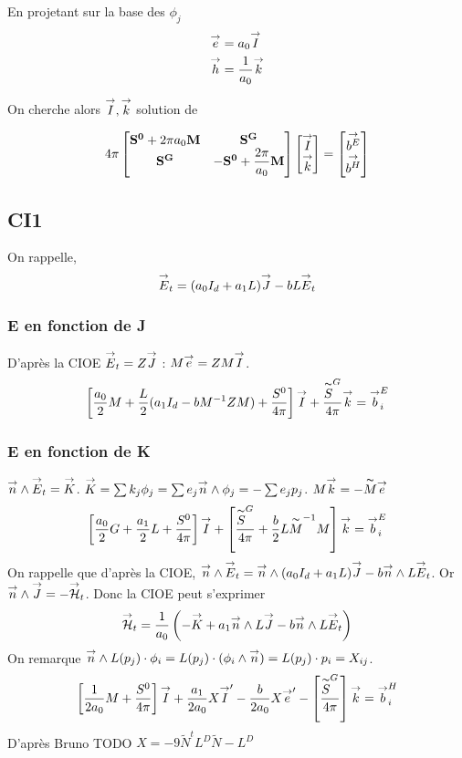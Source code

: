       En projetant sur la base des \(\phi_j\)
      \begin{align}
        \vect{e} &= a_0 \vect{I} \\
        \vect{h} &= \frac{1}{a_0} \vect{k}
      \end{align}

    On cherche alors \(\vect{I},\vect{k}\) solution de 

    \begin{equation}
      4\pi
      \begin{bmatrix}
        \mat{S^0}+2\pi a_0 \mM & \mat{S^G} \\
        \mat{S^G} & -\mat{S^0} +  \frac{2\pi}{a_0}\mM
      \end{bmatrix}
      \begin{bmatrix}
        \vect{I}\\
        \vect{k}
      \end{bmatrix}
      =
      \begin{bmatrix}
        \vect{b^E}\\
        \vect{b^H}
      \end{bmatrix}     
    \end{equation}

    \subsection{CI1}
      On rappelle,
      \begin{equation}
        \vE_t = (a_0I_d+a_1L)\vJ -bL\vE_t
      \end{equation}
      \subsubsection{E en fonction de J}
    D’après la CIOE \(\vE_t = Z\vJ\) : \(M\vect e = Z M\vect I\).
    \[
    \left[\frac{a_0}{2}M + \frac{L}{2}(a_1I_d - bM^{-1}ZM) + \frac{S^0}{4\pi}\right]\vect I + \frac{\tilde S^G }{4\pi}\vect k = \vect b_i^E
    \]
    \subsubsection{E en fonction de K}
    \(\vn \pvect \vE_t = \vK\).
    \(\vK = \sum k_j \phi_j = \sum e_j \vn \pvect \phi_j = -\sum e_j p_j \).
    \(M \vect k = - \tilde M \vect e\)
    \[
    \left[\frac{a_0}{2}G + \frac{a_1}{2}L+\frac{S^0}{4\pi}\right]\vect I + \left[\frac{\tilde S^G }{4\pi}+  \frac{b}{2}L\tilde M^{-1}M \right]\vect k = \vect b_i^E
    \]
    On rappelle que d’après la CIOE, \(\vn \pvect \vE_t = \vn \pvect (a_0I_d+a_1L)\vJ -b\vn\pvect L\vE_t\). Or \(\vn\pvect \vJ = -\vH_t\). Donc la CIOE peut s'exprimer
    \[
    \vH_t = \frac{1}{a_0}\left(-\vK + a_1 \vn\pvect L\vJ -b\vn\pvect L\vE_t\right)
    \]
        On remarque \( \vn \pvect L(p_j)\cdot \phi_i = L(p_j)\cdot(\phi_i\pvect\vn) = L(p_j)\cdot p_i = X_{ij}\). 
    \[
    \left[\frac{1}{2a_0}M + \frac{S^0}{4\pi}\right]\vect I + \frac{a_1}{2a_0}X\vect I' - \frac{b}{2a_0}X\vect e' - \left[ \frac{\tilde S^G}{4\pi}\right]\vect k = \vect b_i^H
    \]
    D’après Bruno TODO \(X = -9\tilde N^tL^D\tilde N - L^D\) %

